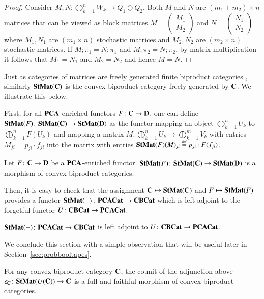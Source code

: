 \begin{proof}
Consider $M,N \colon \bigoplus_{k=1}^n W_k \to Q_1 \oplus Q_2$.
Both $M$ and $N$ are $(m_1+m_2)\times n$ matrices that can be viewed as block matrices $M=\begin{pmatrix} M_1 \\ M_2 \end{pmatrix}$ and $N=\begin{pmatrix} N_1 \\ N_2 \end{pmatrix}$
where $M_1,N_1$ are $(m_1\times n)$ stochastic matrices and $M_2,N_2$ are $(m_2\times n)$ stochastic matrices. If $M;\pi_1 = N;\pi_1$ and $M;\pi_2 = N;\pi_2$, by matrix multiplication it follows that $M_1=N_1$ and $M_2=N_2$ and hence $M=N$. 
\end{proof}



Just as categories of matrices are freely generated finite biproduct categories \cite{mac_lane_categories_1978}, similarly  $\mathbf{StMat}(\mathbf{C})$ is the convex biproduct category freely generated by $\mathbf{C}$. We  illustrate this below. 


First, for all $\mathbf{PCA}$-enriched functors $F\colon \mathbf{C}\to \mathbf{D}$, one can define $\mathbf{StMat}(F)\colon \mathbf{StMat}(\mathbf{C})\to \mathbf{StMat}(\mathbf{D})$ as the functor mapping an object $\bigoplus_{k=1}^n U_k$ to $\bigoplus_{k=1}^n F(U_k)$ and mapping a matrix
$M\colon\bigoplus_{k=1}^n U_k\to \bigoplus_{k=1}^m V_k$ with entries $M_{ji}= p_{ji}\cdot f_{ji}$  into the matrix with entries $\mathbf{StMat}(F)(M)_{ji}\stackrel{\text{\tiny def}}{=} p_{ji}\cdot F(f_{ji})$.%
\begin{proposition}\label{prop:stmatfun}
    Let $F\colon \mathbf{C}\to \mathbf{D}$ be a $\mathbf{PCA}$-enriched functor. $\mathbf{StMat}(F) \colon\mathbf{StMat}(\mathbf{C})\to \mathbf{StMat}(\mathbf{D})$ is a morphism of convex biproduct categories.
\end{proposition}
Then, it is easy to check that the assignment $\mathbf{C} \mapsto \mathbf{StMat}(\mathbf{C})$ and $F \mapsto \mathbf{StMat}(F)$ provides a functor $\mathbf{StMat}(-):\mathbf{PCACat}\to \mathbf{CBCat}$ which is left adjoint to the forgetful functor $U\colon \mathbf{CBCat} \to \mathbf{PCACat}$.
\begin{theorem}\label{thm:matfree}
    $\mathbf{StMat}(-) \colon \mathbf{PCACat}\to \mathbf{CBCat}$ is left adjoint to $U\colon \mathbf{CBCat} \to \mathbf{PCACat}$.
\end{theorem}
We conclude this section with a simple observation that will be useful later in Section~\ref{sec:probbooltapes}.
\begin{proposition}\label{prop:counit fullfaithful}
    For any convex biproduct category $\mathbf{C}$, the counit of the adjunction above\\ $\epsilon_{\mathbf{C}}\colon \mathbf{StMat}(U(\mathbf{C}))\to \mathbf{C}$ is a full and faithful morphism of convex biproduct categories.
\end{proposition}


